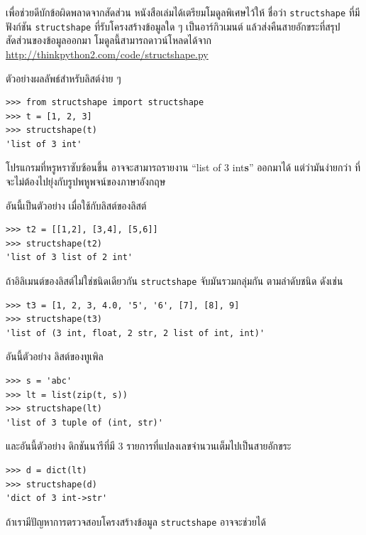 เพื่อช่วยดีบักข้อผิดพลาดจากสัดส่วน หนังสือเล่มได้เตรียมโมดูลพิเศษไว้ให้ ชื่อว่า \texttt{structshape} 
ที่มีฟังก์ชัน \texttt{structshape}
ที่รับโครงสร้างข้อมูลใด ๆ เป็นอาร์กิวเมนต์ แล้วส่งคืนสายอักขระที่สรุปสัดส่วนของข้อมูลออกมา
โมดูลนี้สามารถดาวน์โหลดได้จาก
\url{http://thinkpython2.com/code/structshape.py}

ตัวอย่างผลลัพธ์สำหรับลิสต์ง่าย ๆ

\begin{verbatim}
>>> from structshape import structshape
>>> t = [1, 2, 3]
>>> structshape(t)
'list of 3 int'
\end{verbatim}
%
%
โปรแกรมที่หรูหราซับซ้อนขึ้น อาจจะสามารถรายงาน
``list of 3 int\textbf{s}'' ออกมาได้
แต่ว่ามันง่ายกว่า ที่จะไม่ต้องไปยุ่งกับรูปพหูพจน์ของภาษาอังกฤษ


อันนี้เป็นตัวอย่าง เมื่อใช้กับลิสต์ของลิสต์

\begin{verbatim}
>>> t2 = [[1,2], [3,4], [5,6]]
>>> structshape(t2)
'list of 3 list of 2 int'
\end{verbatim}
%
%
ถ้าอิลิเมนต์ของลิสต์ไม่ใช่ชนิดเดียวกัน
\texttt{structshape} จับมันรวมกลุ่มกัน ตามลำดับชนิด ดังเช่น

\begin{verbatim}
>>> t3 = [1, 2, 3, 4.0, '5', '6', [7], [8], 9]
>>> structshape(t3)
'list of (3 int, float, 2 str, 2 list of int, int)'
\end{verbatim}
%
%
อันนี้ตัวอย่าง ลิสต์ของทูเพิล

\begin{verbatim}
>>> s = 'abc'
>>> lt = list(zip(t, s))
>>> structshape(lt)
'list of 3 tuple of (int, str)'
\end{verbatim}
%
%
และอันนี้ตัวอย่าง ดิกชันนารีที่มี 3 รายการที่แปลงเลขจำนวนเต็มไปเป็นสายอักขระ

\begin{verbatim}
>>> d = dict(lt) 
>>> structshape(d)
'dict of 3 int->str'
\end{verbatim}
%
%
ถ้าเรามีปัญหาการตรวจสอบโครงสร้างข้อมูล
\texttt{structshape} อาจจะช่วยได้

